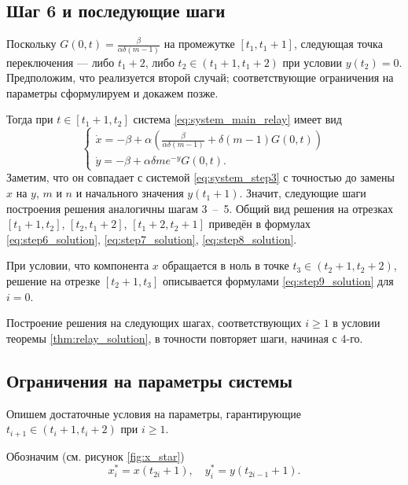 \subsection{Шаг 6 и последующие шаги}
Поскольку $G(0, t) = \frac{\beta}{\alpha \delta (m - 1)}$ на промежутке $[t_1, t_1 + 1]$, следующая точка переключения --- либо $t_1 + 2$, либо $t_2 \in (t_1 + 1, t_1 + 2)$ при условии $y(t_2) = 0$. Предположим, что реализуется второй случай; соответствующие ограничения на параметры сформулируем и докажем позже.

Тогда при $t \in [t_1 + 1, t_2]$ система \eqref{eq:system_main_relay} имеет вид
%
\begin{equation}
	\label{eq:step6_system}
	\begin{cases}
		\dot{x} = -\beta + \alpha \left(\frac{\beta}{\alpha \delta (m - 1)} + \delta (m - 1) G(0, t)\right)\\
		\dot{y} = -\beta + \alpha \delta m e^{-y} G(0, t).
	\end{cases}
\end{equation}
%
Заметим, что он совпадает с системой \eqref{eq:system_step3} с точностью до замены $x$ на $y$, $m$ и $n$ и начального значения $y(t_1 + 1)$. Значит, следующие шаги построения решения аналогичны шагам 3~--~5. Общий вид решения на отрезках $[t_1 + 1, t_2]$, $[t_2, t_1 + 2]$, $[t_1 + 2, t_2 + 1]$ приведён в формулах \eqref{eq:step6_solution}, \eqref{eq:step7_solution},  \eqref{eq:step8_solution}.

При условии, что компонента $x$ обращается в ноль в точке $t_3 \in (t_2 + 1, t_2 + 2)$, решение на отрезке $[t_2 + 1, t_3]$ описывается формулами \eqref{eq:step9_solution} для $i = 0$.

Построение решения на следующих шагах, соответствующих $i \geqslant 1$ в условии теоремы \ref{thm:relay_solution}, в точности повторяет шаги, начиная с 4-го.

\subsection{Ограничения на параметры системы}
Опишем достаточные условия на параметры, гарантирующие $t_{i + 1} \in (t_i + 1, t_i + 2)$ при $i \geqslant 1$.

Обозначим (см. рисунок \ref{fig:x_star})
\begin{equation}
	\label{eq:x_star_definition}
	x^*_i = x(t_{2i} + 1), \quad y^*_i = y(t_{2i - 1} + 1).
\end{equation}

